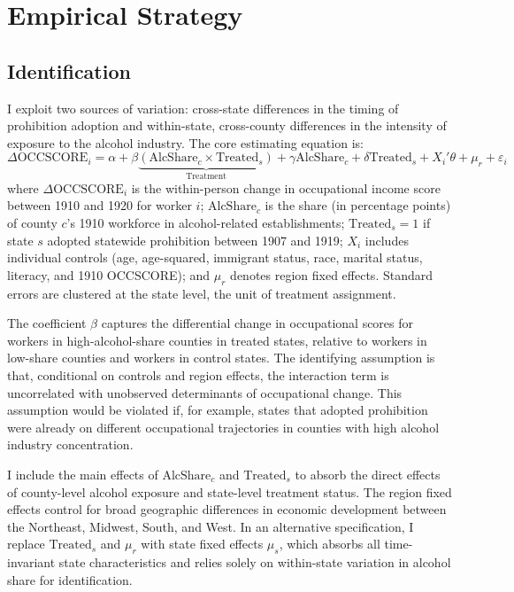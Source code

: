 \documentclass[12pt]{article}
\begin{document}
\begin{table}[H]
\centering
\caption{Summary Statistics by Treatment Group}
\label{tab:summary}

\end{table}


\section{Empirical Strategy}
\label{sec:strategy}

\subsection{Identification}

I exploit two sources of variation: cross-state differences in the timing of prohibition adoption and within-state, cross-county differences in the intensity of exposure to the alcohol industry. The core estimating equation is:
\begin{equation}
\Delta \text{OCCSCORE}_{i} = \alpha + \beta \underbrace{(\text{AlcShare}_{c} \times \text{Treated}_{s})}_{\text{Treatment}} + \gamma \text{AlcShare}_{c} + \delta \text{Treated}_{s} + X_i'\theta + \mu_r + \varepsilon_{i}
\label{eq:main}
\end{equation}
where $\Delta \text{OCCSCORE}_{i}$ is the within-person change in occupational income score between 1910 and 1920 for worker $i$; $\text{AlcShare}_{c}$ is the share (in percentage points) of county $c$'s 1910 workforce in alcohol-related establishments; $\text{Treated}_{s} = 1$ if state $s$ adopted statewide prohibition between 1907 and 1919; $X_i$ includes individual controls (age, age-squared, immigrant status, race, marital status, literacy, and 1910 OCCSCORE); and $\mu_r$ denotes region fixed effects. Standard errors are clustered at the state level, the unit of treatment assignment.

The coefficient $\beta$ captures the differential change in occupational scores for workers in high-alcohol-share counties in treated states, relative to workers in low-share counties and workers in control states. The identifying assumption is that, conditional on controls and region effects, the interaction term is uncorrelated with unobserved determinants of occupational change. This assumption would be violated if, for example, states that adopted prohibition were already on different occupational trajectories in counties with high alcohol industry concentration.

I include the main effects of $\text{AlcShare}_{c}$ and $\text{Treated}_{s}$ to absorb the direct effects of county-level alcohol exposure and state-level treatment status. The region fixed effects control for broad geographic differences in economic development between the Northeast, Midwest, South, and West. In an alternative specification, I replace $\text{Treated}_{s}$ and $\mu_r$ with state fixed effects $\mu_s$, which absorbs all time-invariant state characteristics and relies solely on within-state variation in alcohol share for identification.
\end{document}
